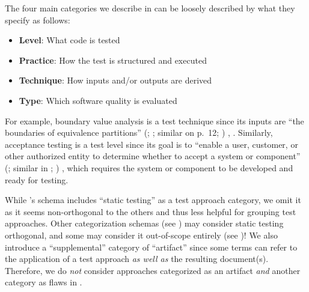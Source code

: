 The four main categories we describe in  can be loosely
described by what they specify as follows:
\begin{itemize}
    \item \textbf{Level}: What code is tested
    \item \textbf{Practice}: How the test is structured and executed
    \item \textbf{Technique}: How inputs and/or outputs are derived
    \item \textbf{Type}: Which software quality is evaluated
\end{itemize}
For example, boundary value analysis is a test technique since its inputs are
``the boundaries of equivalence partitions'' \ifnotpaper
    (\citealp[p.~2]{IEEE2022}; \citeyear[p.~1]{IEEE2021}; similar on p.~12;
    \citealpISTQB{})%
\else
    \cite[p.~2]{IEEE2022}, \cite[p.~1]{IEEE2021}%
\fi. Similarly, acceptance testing is a test level since its goal is to
``enable a user, customer, or other authorized entity to determine whether to
accept a system or component'' \ifnotpaper (\citealp[p.~5]{IEEE2017}; similar
    in \citeyear[p.~6]{IEEE2021}; \citealp[p.~344]{SakamotoEtAl2013})\else
    \cite[p.~5]{IEEE2017}\fi, which requires the system or component to be
developed and ready for testing.


While \citet{IEEE2022}'s schema includes ``static testing'' as a test
approach category, we omit it as it seems non-orthogonal to the others
and thus less helpful for grouping test approaches. \ifnotpaper Other
    categorization schemas (see ) may consider static testing
    orthogonal, and some may consider it out-of-scope entirely (see
    )! \fi We also introduce a ``supplemental'' category of
``artifact'' since some terms can refer to the
application of a test approach \emph{as well as} the resulting document(s).
Therefore, we do \emph{not} consider approaches categorized as an artifact
\emph{and} another category as flaws in .


